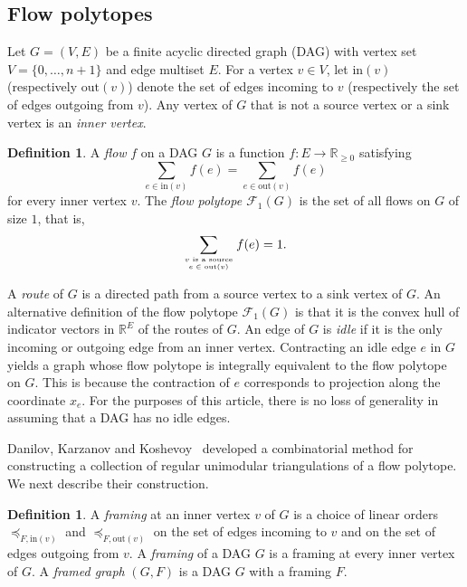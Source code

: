 \documentclass[12pt]{amsart}
\theoremstyle{definition}
\newtheorem{definition}[theorem]{Definition}
\newcommand{\defn}[1]{\emph{\color{blue} #1}}
\newcommand\bbR{\mathbb{R}}
\newcommand\calF{\mathcal{F}}
\newcommand\inedge{\mathrm{in}}
\newcommand\outedge{\mathrm{out}}
\begin{document}
\subsection{Flow polytopes}\label{sec:flowpolytopes}

Let $G=(V,E)$ be a finite acyclic directed graph (DAG) with vertex set $V = \{0,\ldots, n+1\}$ and edge multiset $E$.
For a vertex $v\in V$, let $\inedge(v)$ (respectively $\outedge(v)$) denote the set of edges incoming to $v$ (respectively the set of edges outgoing from $v$).
Any vertex of $G$ that is not a source vertex or a sink vertex is an \defn{inner vertex}.

\begin{definition}
A \defn{flow} $f$ on a DAG $G$ is a function $f:E \rightarrow \bbR_{\geq0}$ satisfying
\[
\sum_{e\in \inedge(v)} f(e) = \sum_{e\in \outedge(v)} f(e)
\]
for every inner vertex $v$.
The \defn{flow polytope $\calF_1(G)$} is the set of all flows on $G$ of size $1$, that is,
\[
\sum_{\genfrac{}{}{0pt}{}{\hbox{\tiny $v$ is a source}}{\hbox{\tiny $e\in \outedge(v)$}}} f(e) =1.
\]
\end{definition}

A \defn{route} of $G$ is a directed path from a source vertex to a sink vertex of $G$.  
An alternative definition of the flow polytope $\calF_1(G)$ is that it is the convex hull of indicator vectors in $\mathbb{R}^E$ of the routes of $G$.
An edge of $G$ is \defn{idle} if it is the only incoming or outgoing edge from an inner vertex.
Contracting an idle edge $e$ in $G$ yields a graph whose flow polytope is integrally equivalent to the flow polytope on $G$.
This is because the contraction of $e$ corresponds to projection along the coordinate $x_e$.
For the purposes of this article, there is no loss of generality in assuming that a DAG has no idle edges.


Danilov, Karzanov and Koshevoy~\cite{DKK12} developed a combinatorial method for constructing a collection of regular unimodular triangulations of a flow polytope.
We next describe their construction.

\begin{definition}
A \defn{framing} at an inner vertex $v$ of $G$ is a choice of linear orders $\preceq_{F,\inedge(v)}$ and $\preceq_{F,\outedge(v)}$ on the set of edges incoming to $v$ and on the set of edges outgoing from $v$.  
A \defn{framing} of a DAG $G$ is a framing at every inner vertex of $G$.
A \defn{framed graph} $(G,F)$ is a DAG $G$ with a framing $F$.
\end{definition}
\end{document}
